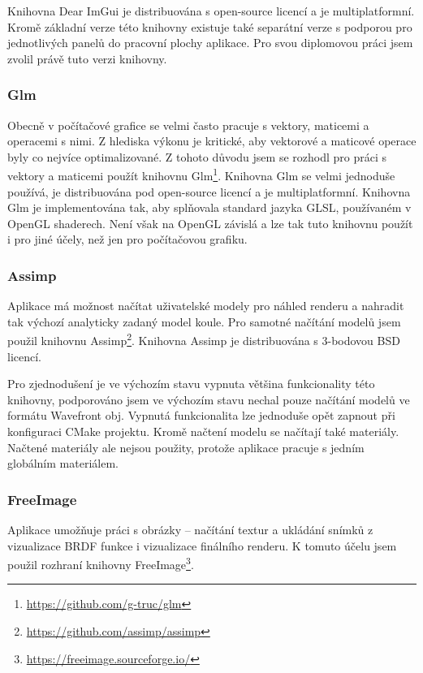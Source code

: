 \documentclass[czech,master]{diploma}
\begin{document}
Knihovna Dear ImGui je distribuována s open-source licencí a je multiplatformní. Kromě základní verze této knihovny existuje také separátní verze s podporou pro  jednotlivých panelů do pracovní plochy aplikace. Pro svou diplomovou práci jsem zvolil právě tuto verzi knihovny.

\subsubsection{Glm}
Obecně v počítačové grafice se velmi často pracuje s vektory, maticemi a operacemi s nimi. Z hlediska výkonu je kritické, aby vektorové a maticové operace byly co nejvíce optimalizované. Z tohoto důvodu jsem se rozhodl pro práci s vektory a maticemi použít knihovnu Glm\footnote{\url{https://github.com/g-truc/glm}}. Knihovna Glm se velmi jednoduše používá, je distribuována pod open-source licencí a je multiplatformní. Knihovna Glm je implementována tak, aby splňovala standard jazyka GLSL, používaném v OpenGL shaderech. Není však na OpenGL závislá a lze tak tuto knihovnu použít i pro jiné účely, než jen pro počítačovou grafiku.

\subsubsection{Assimp}
Aplikace má možnost načítat uživatelské modely pro náhled renderu a nahradit tak výchozí analyticky zadaný model koule. Pro samotné načítání modelů jsem použil knihovnu Assimp\footnote{\url{https://github.com/assimp/assimp}}. Knihovna Assimp je distribuována s 3-bodovou BSD licencí. \par
Pro zjednodušení je ve výchozím stavu vypnuta většina funkcionality této knihovny, podporováno jsem ve výchozím stavu nechal pouze načítání modelů ve formátu Wavefront obj. Vypnutá funkcionalita lze jednoduše opět zapnout při konfiguraci CMake projektu. Kromě načtení modelu se načítají také materiály. Načtené materiály ale nejsou použity, protože aplikace pracuje s jedním globálním materiálem.

\subsubsection{FreeImage}
Aplikace umožňuje práci s obrázky -- načítání textur a ukládání snímků z vizualizace BRDF funkce i vizualizace finálního renderu. K tomuto účelu jsem použil rozhraní knihovny FreeImage\footnote{\url{https://freeimage.sourceforge.io/}}.
\end{document}
